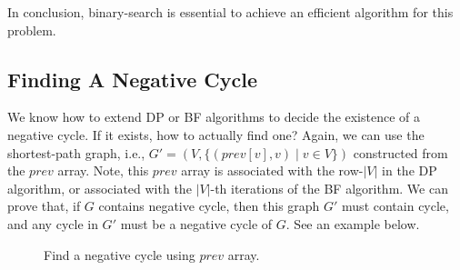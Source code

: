 \documentclass[letterpaper,11pt]{article}
\theoremstyle{mytheorem}
\begin{document}
In conclusion, binary-search is essential to achieve an efficient algorithm for this problem.

\subsection*{Finding A Negative Cycle}

We know how to extend DP or BF algorithms to decide the existence of a negative cycle.
If it exists, how to actually find one?
Again, we can use the shortest-path graph, i.e., $G' = (V, \{(prev[v], v) \mid v\in V\})$ constructed
from the $prev$ array. Note, this $prev$ array is associated with the row-$|V|$ in the DP algorithm,
or associated with the $|V|$-th iterations of the BF algorithm.
We can prove that, if $G$ contains negative cycle, then this graph $G'$ must contain cycle,
and any cycle in $G'$ must be a negative cycle of $G$. See an example below.

\begin{figure}[h]
\centering{}
\caption{Find a negative cycle using $prev$ array.}
\label{fig:dpbf}
\end{figure}
\end{document}
